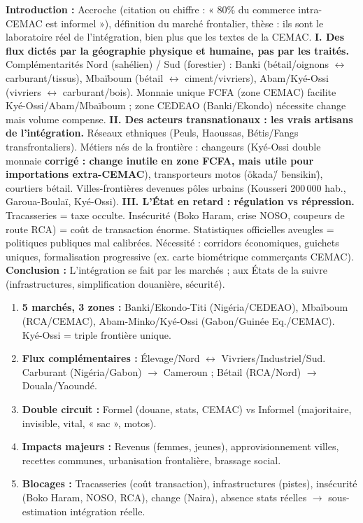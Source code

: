 \documentclass[11pt]{article}
\begin{document}
\begin{corrige}
\textbf{Introduction :} Accroche (citation ou chiffre : « 80\% du commerce intra-CEMAC est informel »), définition du marché frontalier, thèse : ils sont le laboratoire réel de l'intégration, bien plus que les textes de la CEMAC.
\textbf{I. Des flux dictés par la géographie physique et humaine, pas par les traités.}
Complémentarités Nord (sahélien) / Sud (forestier) : Banki (bétail/oignons $\leftrightarrow$ carburant/tissus), Mbaïboum (bétail $\leftrightarrow$ ciment/vivriers), Abam/Kyé-Ossi (vivriers $\leftrightarrow$ carburant/bois). Monnaie unique FCFA (zone CEMAC) facilite Kyé-Ossi/Abam/Mbaïboum ; zone CEDEAO (Banki/Ekondo) nécessite change mais volume compense.
\textbf{II. Des acteurs transnationaux : les vrais artisans de l'intégration.}
Réseaux ethniques (Peuls, Haoussas, Bétis/Fangs transfrontaliers). Métiers nés de la frontière : changeurs (Kyé-Ossi double monnaie \textbf{corrigé : change inutile en zone FCFA, mais utile pour importations extra-CEMAC}), transporteurs motos (\"okada\" / \"bensikin\"), courtiers bétail. Villes-frontières devenues pôles urbains (Kousseri 200\,000 hab., Garoua-Boulaï, Kyé-Ossi).
\textbf{III. L'État en retard : régulation vs répression.}
Tracasseries = taxe occulte. Insécurité (Boko Haram, crise NOSO, coupeurs de route RCA) = coût de transaction énorme. Statistiques officielles aveugles = politiques publiques mal calibrées. Nécessité : corridors économiques, guichets uniques, formalisation progressive (ex. carte biométrique commerçants CEMAC).
\textbf{Conclusion :} L'intégration se fait par les marchés ; aux États de la suivre (infrastructures, simplification douanière, sécurité).
\end{corrige}

\begin{aretenir}
\begin{enumerate}
    \item \textbf{5 marchés, 3 zones :} Banki/Ekondo-Titi (Nigéria/CEDEAO), Mbaïboum (RCA/CEMAC), Abam-Minko/Kyé-Ossi (Gabon/Guinée Eq./CEMAC). Kyé-Ossi = triple frontière unique.
    \item \textbf{Flux complémentaires :} Élevage/Nord $\leftrightarrow$ Vivriers/Industriel/Sud. Carburant (Nigéria/Gabon) $\to$ Cameroun ; Bétail (RCA/Nord) $\to$ Douala/Yaoundé.
    \item \textbf{Double circuit :} Formel (douane, stats, CEMAC) vs Informel (majoritaire, invisible, vital, « sac », motos).
    \item \textbf{Impacts majeurs :} Revenus (femmes, jeunes), approvisionnement villes, recettes communes, urbanisation frontalière, brassage social.
    \item \textbf{Blocages :} Tracasseries (coût transaction), infrastructures (pistes), insécurité (Boko Haram, NOSO, RCA), change (Naira), absence stats réelles $\to$ sous-estimation intégration réelle.
\end{enumerate}
\end{aretenir}
\end{document}
